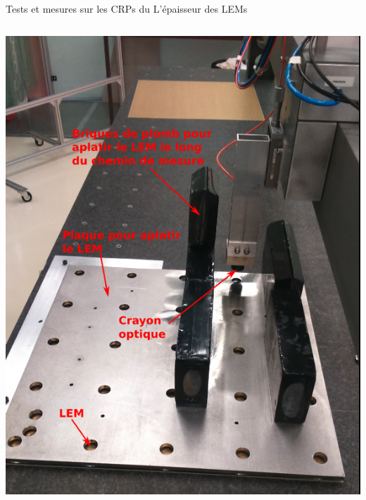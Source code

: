 \begin{frame}{Tests et mesures sur les CRPs du \SSS{}}{L'épaisseur des LEMs}
\begin{scriptsize}
\begin{columns}
\begin{column}{0.5\textwidth}
    				\centering \includegraphics[height=0.6\textheight]{./pictures/plate_and_bricks.png}\\
    			\end{column}
    		\end{columns}
    	\end{scriptsize}
    \end{frame}

